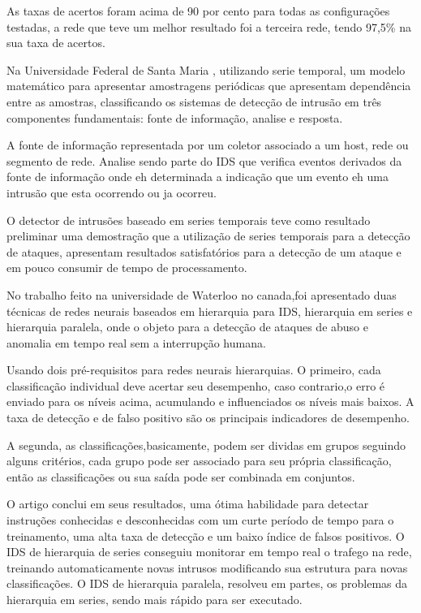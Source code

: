\documentclass[
	12pt,				%
	openright,			%
	oneside,
	a4paper,			%
	english,			%
	french,				%
	spanish,			%
	brazil				%
	]{abntex2}
\begin{document}
As taxas de acertos foram acima de 90 por cento para todas as configurações testadas, a rede que teve um melhor resultado foi a terceira rede, tendo 97,5\% na sua taxa de acertos.

Na Universidade Federal de Santa Maria \cite{Dalmazo}, utilizando serie temporal, um modelo matemático para apresentar amostragens periódicas que apresentam dependência entre as amostras, classificando os sistemas de detecção de intrusão em três componentes fundamentais: fonte de informação, analise e resposta.

A fonte de informação representada por um coletor associado a um host, rede ou segmento de rede. Analise sendo parte do IDS que verifica eventos derivados da fonte de informação onde eh determinada a indicação que um evento eh uma intrusão que esta ocorrendo ou ja ocorreu.

O detector de intrusões baseado em series temporais teve como resultado preliminar uma demostração que a utilização de series temporais para a detecção de ataques, apresentam resultados satisfatórios para a detecção de um ataque e em pouco consumir de tempo de processamento.

No trabalho feito na universidade de Waterloo no canada\cite{Chunlin},foi apresentado duas técnicas de redes neurais baseados em hierarquia para IDS, hierarquia em series e hierarquia paralela, onde o objeto para a detecção de ataques de abuso e anomalia em tempo real sem a interrupção humana.

Usando dois pré-requisitos para redes neurais hierarquias. O primeiro, cada classificação individual deve acertar seu desempenho, caso contrario,o erro é enviado para os níveis acima, acumulando e influenciados os níveis mais baixos. A taxa de detecção e de falso positivo são os principais indicadores de desempenho. 

A segunda, as classificações,basicamente, podem ser dividas em grupos seguindo alguns critérios, cada grupo pode ser associado para seu própria classificação, então as classificações ou sua saída pode ser combinada em conjuntos.

O artigo conclui em seus resultados, uma ótima habilidade para detectar instruções conhecidas e desconhecidas com um curte período de tempo para o treinamento, uma alta taxa de detecção e um baixo índice de falsos positivos.
O IDS de hierarquia de series conseguiu monitorar em tempo real o trafego na rede, treinando automaticamente novas intrusos modificando sua estrutura para novas classificações. O IDS de hierarquia paralela, resolveu em partes, os problemas da hierarquia em series, sendo mais rápido para ser executado.
\end{document}
